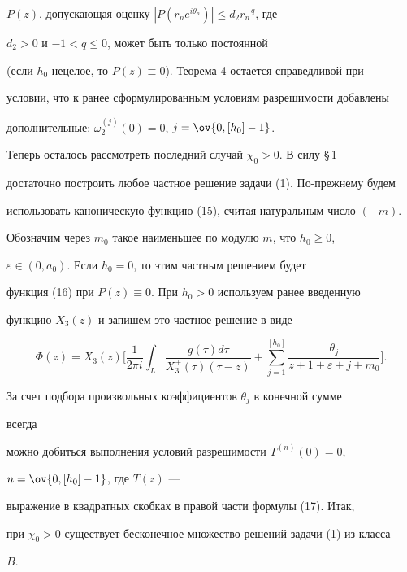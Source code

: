 $P(z)$, допускающая оценку $|P(r_n e^{i\theta_n})|\le d_2r^{-q}_n$, где 


$d_2>0$ и $-1<q\le0$, может быть только постоянной 


(если $h_0$ нецелое, то $P(z)\equiv0$). Теорема 4 остается справедливой при 


условии, что к ранее сформулированным условиям разрешимости добавлены 


дополнительные: $\omega^{(j)}_2(0)=0$, $j=\ov{0,[h_0]-1}$. 


 


Теперь осталось рассмотреть последний случай $\chi_0>0$. В силу \S\,1 


достаточно построить любое частное решение задачи (1). По-прежнему будем 


использовать каноническую функцию (15), считая натуральным число $(-m)$. 


Обозначим через $m_0$ такое наименьшее по модулю $m$, что $h_0\ge0$, 


$\varepsilon\in(0,a_0)$. Если $h_0=0$, то этим частным решением будет 


функция (16) при $P(z)\equiv0$. При $h_0>0$ используем ранее введенную 


функцию $X_3(z)$ и запишем это частное решение в виде 


\begin{equation} 


\Phi(z)=X_3(z)\bigg[\frac{1}{2\pi i}\int_L \frac{g(\tau)d\tau} 


{X^+_3(\tau)(\tau-z)}+\sum^{[h_0]}_{j=1} \frac{\theta_j} 


{z+1+\varepsilon+j+m_0}\bigg]. 


\end{equation} 


За счет подбора произвольных коэффициентов $\theta_j$ в конечной сумме 


всегда 


можно добиться выполнения условий разрешимости $T^{(n)}(0)=0$, 


$n=\ov{0,[h_0]-1}$, где $T(z)$ --- 


выражение в квадратных скобках в правой части формулы (17). Итак, 


при $\chi_0>0$ существует бесконечное множество решений задачи (1) из класса 


$B$. 


 


 



